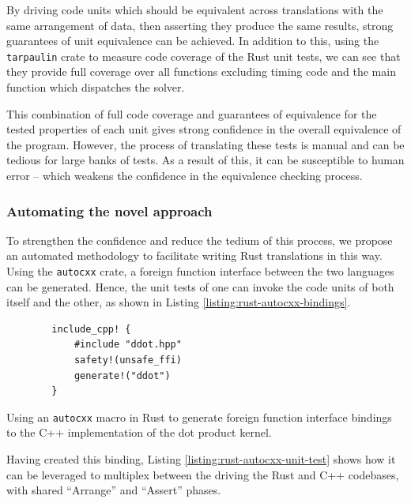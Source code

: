 By driving code units which should be equivalent across translations with the same arrangement of data, then asserting they produce the same results, strong guarantees of unit equivalence can be achieved. In addition to this, using the \texttt{tarpaulin} crate \cite{xd009642Xd009642Tarpaulin2024} to measure code coverage of the Rust unit tests, we can see that they provide full coverage over all functions excluding timing code and the main function which dispatches the solver. 

This combination of full code coverage and guarantees of equivalence for the tested properties of each unit gives strong confidence in the overall equivalence of the program. However, the process of translating these tests is manual and can be tedious for large banks of tests. As a result of this, it can be susceptible to human error -- which weakens the confidence in the equivalence checking process.

\subsubsection{Automating the novel approach}
\label{sssec:equivalence-polyglotest}

To strengthen the confidence and reduce the tedium of this process, we propose an automated methodology to facilitate writing Rust translations in this way. Using the \texttt{autocxx} crate, a foreign function interface between the two languages can be generated. Hence, the unit tests of one can invoke the code units of both itself and the other, as shown in Listing \ref{listing:rust-autocxx-bindings}.

\begin{code}
    \begin{verbatim}
        include_cpp! {
            #include "ddot.hpp"
            safety!(unsafe_ffi)
            generate!("ddot")
        }
    \end{verbatim}
    \caption{Using an \texttt{autocxx} macro in Rust to generate foreign function interface bindings to the C++ implementation of the dot product kernel.}
    \label{listing:rust-autocxx-bindings}
\end{code}

Having created this binding, Listing \ref{listing:rust-autocxx-unit-test} shows how it can be leveraged to multiplex between the driving the Rust and C++ codebases, with shared ``Arrange'' and ``Assert'' phases.

